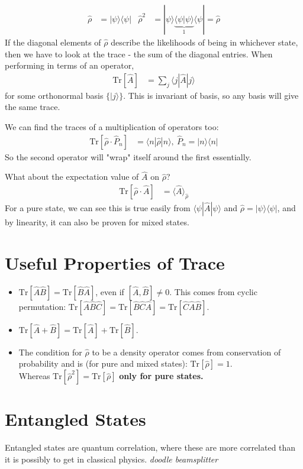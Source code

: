\documentclass[a4paper, 11pt, normalem]{report}
\newcommand\hrho{\hat{\rho}}
\begin{document}
\begin{align}
    \hrho &= |\psi\rangle\langle\psi| & \hrho^2 &= |\psi\rangle\underbrace{\langle\psi|\psi\rangle}_{1}\langle\psi| = \hrho
\end{align}
If the diagonal elements of $\hrho$ describe the likelihoods of being in whichever state, then we have to look at the trace - the sum of the diagonal entries. 
When performing in terms of an operator, 
\begin{align}
    \text{Tr}[\hat{A}] &= \sum_j \langle j|\hat{A}|j\rangle
\end{align}
for some orthonormal basis $\{|j\rangle\}$.
This is invariant of basis, so any basis will give the same trace.

We can find the traces of a multiplication of operators too:
\begin{align}
    \text{Tr}[\hrho\cdot\hat{P}_n] &= \langle n|\hrho|n\rangle,~ \hat{P}_n = |n\rangle\langle n|
\end{align}
So the second operator will "wrap" itself around the first essentially. 

What about the expectation value of $\hat{A}$ on $\hrho$?
\begin{align}
    \text{Tr}[\hrho\cdot\hat{A}] &= \langle\hat{A}\rangle_{\hrho}
\end{align}
For a pure state, we can see this is true easily from $\langle\psi|\hat{A}|\psi\rangle$ and $\hrho = |\psi\rangle\langle\psi|$, and by linearity, it can also be proven for mixed states. 

\section{Useful Properties of Trace}
\begin{itemize}
    \item $\text{Tr}[\hat{A}\hat{B}] = \text{Tr}[\hat{B}\hat{A}]$, even if $[\hat{A},\hat{B}]\neq0$.
        This comes from cyclic permutation: $\text{Tr}[\hat{A}\hat{B}\hat{C}] = \text{Tr}[\hat{B}\hat{C}\hat{A}] = \text{Tr}[\hat{C}\hat{A}\hat{B}]$.
    \item $\text{Tr}[\hat{A}+\hat{B}] = \text{Tr}[\hat{A}] + \text{Tr}[\hat{B}]$.
    \item The condition for $\hrho$ to be a density operator comes from conservation of probability and is (for pure and mixed states): $\text{Tr}[\hrho] = 1$. \\
        Whereas $\text{Tr}[\hrho^2]=\text{Tr}[\hrho]$ \textbf{only for pure states.}
\end{itemize}

\section{Entangled States}
Entangled states are quantum correlation, where these are more correlated than it is possibly to get in classical physics.
\textit{doodle beamsplitter}
\end{document}

